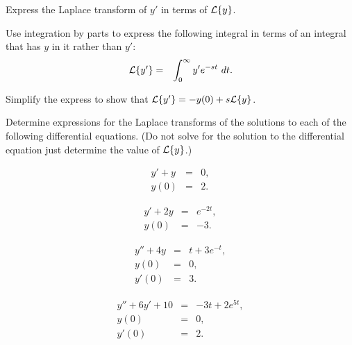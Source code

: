 \begin{problem}
\item Express the Laplace transform of $y'$ in terms of $\laplace{y}$.
  \begin{subproblem}
    \item Use integration by parts to express the following integral
      in terms of an integral that has $y$ in it rather than $y'$:
      \begin{eqnarray}
        \laplace{y'} & = & \int^\infty_0 y' e^{-st} ~ dt.
      \end{eqnarray}
      \vfill

    \item Simplify the express to show that $\laplace{y'} = -y(0) + s\laplace{y}$.
      \vfill

  \end{subproblem}


  \clearpage

\item Determine expressions for the Laplace transforms of the
  solutions to each of the following differential equations. (Do not
  solve for the solution to the differential equation just determine
  the value of $\laplace{y}$.)

  \begin{subproblem}
  \item 
    \begin{eqnarray}
      y' + y & = & 0, \\
      y(0) & = & 2.
    \end{eqnarray}
    \vfill

  \item 
    \begin{eqnarray}
      y' + 2y & = & e^{-2t}, \\
      y(0) & = & -3.
    \end{eqnarray}
    \vfill

  \item 
    \begin{eqnarray}
      y'' + 4y & = & t + 3e^{-t}, \\
      y(0) & = & 0, \\
      y'(0) & = & 3.
    \end{eqnarray}
    \vfill

  \item 
    \begin{eqnarray}
      y'' + 6y' + 10 & = & -3t + 2e^{5t}, \\
      y(0) & = & 0, \\
      y'(0) & = & 2.
    \end{eqnarray}
    \vfill


  \end{subproblem}


\end{problem}


